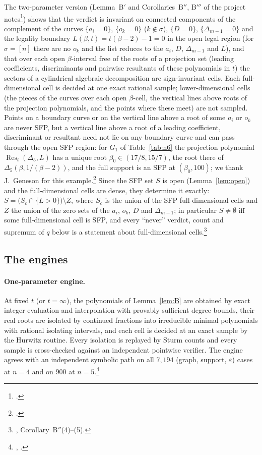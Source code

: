 \documentclass[11pt]{article}
\theoremstyle{definition}
\newcommand{\eps}{\varepsilon}
\begin{document}
The two-parameter version (Lemma~B$'$ and Corollaries~B$''$, B$'''$ of the project
notes\footnote{.}) shows that the verdict is invariant on connected components of
the complement of the curves $\{a_i=0\}$, $\{o_k=0\}$ ($k\notin\sigma$), $\{D=0\}$, $\{\Delta_{m-1}=0\}$ and the
legality boundary $L(\beta,t)=t(\beta-2)-1=0$ in the open legal region (for $\sigma=[n]$ there are no $o_k$ and the
list reduces to the $a_i$, $D$, $\Delta_{m-1}$ and $L$), and that over each open $\beta$-interval free of the roots of a
projection set (leading coefficients, discriminants and pairwise resultants of these polynomials in $t$) the sectors
of a cylindrical algebraic decomposition are sign-invariant cells. Each full-dimensional cell is decided at one exact
rational sample; lower-dimensional cells (the pieces of the curves over each open $\beta$-cell, the vertical lines above roots
of the projection polynomials, and the points where these meet) are not sampled. Points on a boundary curve or on the vertical
line above a root of some $a_i$ or $o_k$ are never SFP, but a vertical line above a root of a
leading coefficient, discriminant or resultant need not lie on any boundary curve and can pass through the open SFP
region: for $G_1$ of Table~\ref{tab:n6} the projection polynomial $\operatorname{Res}_t(\Delta_5,L)$ has a unique root
$\beta_0\in(17/8,15/7)$, the root there of $\Delta_5(\beta,1/(\beta-2))$, and the full support is an SFP at
$(\beta_0,100)$; we thank J.~Geneson for this example.\footnote{.}
Since the SFP set $S$ is open (Lemma~\ref{lem:open}) and the full-dimensional cells are dense, they determine it exactly:
$S=\bigl(\overline{S_c}\cap\{L>0\}\bigr)\setminus Z$, where $S_c$ is the union of the SFP full-dimensional cells and $Z$ the
union of the zero sets of the $a_i$, $o_k$, $D$ and $\Delta_{m-1}$; in particular $S\neq\emptyset$ iff some full-dimensional
cell is SFP, and every ``never'' verdict, count and supremum of $q$ below is a statement about full-dimensional
cells.\footnote{, Corollary~B$''$(4)--(5).}

\subsection{The engines}
\paragraph{One-parameter engine.} At fixed $t$ (or $t=\infty$), the polynomials of Lemma~\ref{lem:B} are obtained by
exact integer evaluation and interpolation with provably sufficient degree bounds, their real roots are isolated by
continued fractions into irreducible minimal polynomials with rational isolating intervals, and each cell is decided
at an exact sample by the Hurwitz routine. Every isolation is replayed by Sturm counts and every sample is
cross-checked against an independent pointwise verifier. The engine agrees with an independent symbolic path on
all $7{,}194$ (graph, support, $\eps$) cases at $n=4$ and on $900$ at $n=5$.\footnote{, .}
\end{document}
